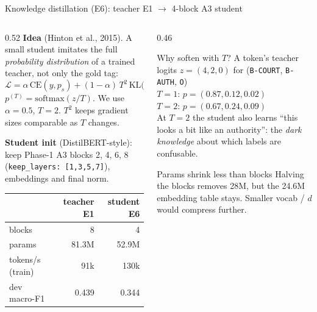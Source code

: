\documentclass[aspectratio=169,11pt]{beamer}
\newcommand{\code}[1]{\texttt{\small #1}}
\begin{document}
\begin{frame}{Knowledge distillation (E6): teacher E1 $\to$ 4-block A3 student}
  \begin{columns}[T]
    \begin{column}{0.52\textwidth}
      \footnotesize
      \textbf{Idea} (Hinton et al., 2015). A small student imitates the full
      \emph{probability distribution} of a trained teacher, not only the gold tag:
      $$\mathcal{L} = \alpha\, \mathrm{CE}(y, p_s) + (1-\alpha)\, T^2\, \mathrm{KL}\big(p_t^{(T)} \,\|\, p_s^{(T)}\big)$$
      $p^{(T)} = \mathrm{softmax}(z/T)$. We use $\alpha = 0.5$, $T = 2$.
      $T^2$ keeps gradient sizes comparable as $T$ changes.
      \vspace{1mm}

      \textbf{Student init} (DistilBERT-style): keep Phase-1 A3 blocks 2, 4, 6, 8
      (\code{keep\_layers: [1,3,5,7]}), embeddings and final norm.
      \vspace{1mm}

      \begin{tabular}{@{}lrr@{}}
        \toprule
        & teacher E1 & student E6 \\
        \midrule
        blocks & 8 & 4 \\
        params & 81.3M & 52.9M \\
        tokens/s (train) & 91k & 130k \\
        dev macro-F1 & 0.439 & 0.344 \\
        \bottomrule
      \end{tabular}
    \end{column}
    \begin{column}{0.46\textwidth}
      \footnotesize
      \begin{exampleblock}{Why soften with $T$? A token's teacher logits}
        $z = (4, 2, 0)$ for (\code{B-COURT}, \code{B-AUTH}, \code{O})\\[1mm]
        $T=1$: $p = (0.87, 0.12, 0.02)$\\
        $T=2$: $p = (0.67, 0.24, 0.09)$\\[1mm]
        At $T=2$ the student also learns ``this looks a bit like an authority'':
        the \emph{dark knowledge} about which labels are confusable.
      \end{exampleblock}
      \begin{alertblock}{Params shrink less than blocks}
        Halving the blocks removes 28M, but the 24.6M embedding table stays.
        Smaller vocab / $d$ would compress further.
      \end{alertblock}
    \end{column}
  \end{columns}
\end{frame}
\end{document}
